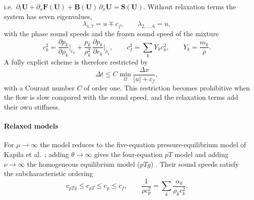 i.e.\ $\partial_t\mathbf U+\partial_x\mathbf F(\mathbf U)+\mathbf B(\mathbf U)\,\partial_x\mathbf U=\mathbf S(\mathbf U)$. Without relaxation terms the system has seven eigenvalues,
\begin{equation}
\lambda_{1,7}=u\mp c_f,\qquad \lambda_{2,\dots,6}=u,
\label{eq:eigs}
\end{equation}
with the phase sound speeds and the frozen sound speed of the mixture
\begin{equation}
c_k^2=\frac{\partial p_k}{\partial\rho_k}\Big|_{e_k}+\frac{p_k}{\rho_k^2}\,\frac{\partial p_k}{\partial e_k}\Big|_{\rho_k},\qquad
c_f^2=\sum_kY_kc_k^2,\qquad Y_k=\frac{m_k}{\rho} .
\label{eq:cf}
\end{equation}
A fully explicit scheme is therefore restricted by
\begin{equation}
\Delta t\le C\min_\Omega\frac{\Delta x}{|u|+c_f},
\label{eq:cfl_explicit}
\end{equation}
with a Courant number $C$ of order one. This restriction becomes prohibitive when the flow is slow compared with the sound speed, and the relaxation terms add their own
stiffness.

\paragraph{Relaxed models}
For $\mu\to\infty$ the model reduces to the five-equation pressure-equilibrium model of Kapila et al.\ \cite{Kapila2001};
adding $\theta\to\infty$ gives the four-equation $pT$ model and adding $\nu\to\infty$ the homogeneous equilibrium model ($pTg$)
\cite{Pelanti2022}. Their sound speeds satisfy the subcharacteristic ordering \cite{FlattenLund2011}
\begin{equation}
c_{pTg}\le c_{pT}\le c_p\le c_f,\qquad \frac1{\rho c_p^2}=\sum_k\frac{\alpha_k}{\rho_kc_k^2} .
\label{eq:subchar}
\end{equation}

